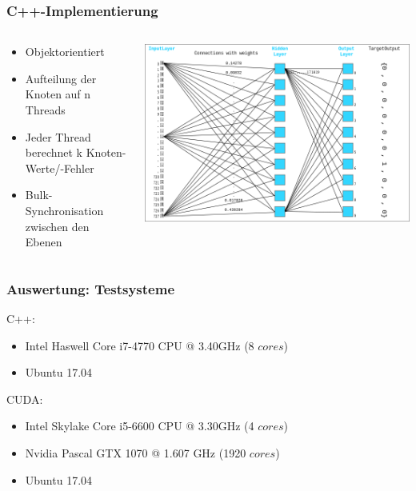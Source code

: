\documentclass[xcolor=pdftex,dvipsnames,table]{beamer}
\begin{document}
	\begin{frame}
		\frametitle{C++-Implementierung}
		\begin{columns}
			\begin{column}{0.5\textwidth}
				\begin{itemize}
					\item Objektorientiert
					\item Aufteilung der Knoten auf n Threads
					\item Jeder Thread berechnet k Knoten-Werte/-Fehler
					\item Bulk-Synchronisation zwischen den Ebenen
				\end{itemize}
			\end{column}
			\begin{column}{0.6\textwidth}
				\includegraphics[width=1\textwidth]{nn.png}
			\end{column}
		\end{columns}
	\end{frame}





	\begin{frame}
	\frametitle{Auswertung: Testsysteme}
		C++:
		\begin{itemize}
			\item Intel Haswell Core i7-4770 CPU @ 3.40GHz (8 $cores$)
			\item Ubuntu 17.04
		\end{itemize}
		
		
		CUDA:
		\begin{itemize}
			\item Intel Skylake Core i5-6600 CPU @ 3.30GHz (4 $cores$)
			\item Nvidia Pascal GTX 1070 @ 1.607 GHz (1920 $cores$)
			\item Ubuntu 17.04 
		\end{itemize}
	\end{frame}
\end{document}
